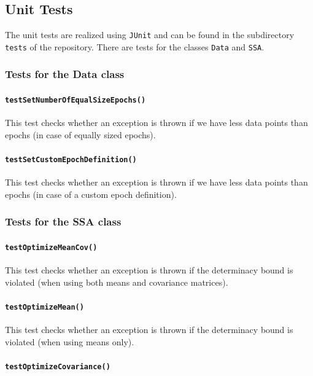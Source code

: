 \documentclass{article}
\newcommand{\1}{\ensuremath{\mathds{1}}}
\newcommand{\0}{\ensuremath{0}}
\begin{document}
\subsection*{Unit Tests}
The unit tests are realized using \texttt{JUnit} and can be found in the subdirectory \texttt{tests} of the repository.
There are tests for the classes \texttt{Data} and \texttt{SSA}.

\subsubsection*{Tests for the Data class}

\paragraph{\texttt{testSetNumberOfEqualSizeEpochs()}}

This test checks whether an exception is thrown if we have less data points than epochs (in case of equally sized epochs).

\paragraph{\texttt{testSetCustomEpochDefinition()}}

This test checks whether an exception is thrown if we have less data points than epochs (in case of a custom epoch definition).

\subsubsection*{Tests for the SSA class}

\paragraph{\texttt{testOptimizeMeanCov()}}

This test checks whether an exception is thrown if the determinacy bound is violated (when using both means and covariance matrices).

\paragraph{\texttt{testOptimizeMean()}}

This test checks whether an exception is thrown if the determinacy bound is violated (when using means only).

\paragraph{\texttt{testOptimizeCovariance()}}
\end{document}
